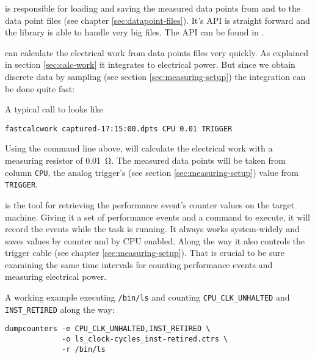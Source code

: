 \label{sec:special-developments}


\JWlfour{\JWTlibdp}

\JWTlibdp is responsible for loading and saving the measured data points from
and to the data point files (see chapter \ref{sec:datapoint-files}). It's API is
straight forward and the library is able to handle very big files. The API can
be found in .


\JWlfour{\JWTfcw}

\JWTfcw can calculate the electrical work from data points files very quickly.
As explained in section \ref{sec:calc-work} it integrates to electrical power.
But since we obtain discrete data by sampling (see section
\ref{sec:measuring-setup}) the integration can be done quite fast:


A typical call to \JWTfcw looks like

\begin{lstlisting}[style=Shell]
fastcalcwork captured-17:15:00.dpts CPU 0.01 TRIGGER
\end{lstlisting}

Using the command line above, \JWTfcw will calculate the electrical work with a
measuring resistor of \SI{0.01}{\ohm}. The measured data points will be taken
from column \texttt{CPU}, the analog trigger's (see section
\ref{sec:measuring-setup}) value from \texttt{TRIGGER}.


\JWlfour{\JWTdc}

\JWTdc is the tool for retrieving the performance event's counter values on the
target machine. Giving it a set of performance events and a command to execute,
it will record the events while the task is running. It always works
system-widely and saves values by counter and by CPU enabled. Along the way it
also controls the trigger cable (see chapter \ref{sec:measuring-setup}).  That
is crucial to be sure examining the same time intervals for counting performance
events and measuring electrical power.

A working example executing \texttt{/bin/ls} and counting
\texttt{CPU\_CLK\_UNHALTED} and \texttt{INST\_RETIRED} along the way:

\begin{lstlisting}[style=Shell]
dumpcounters -e CPU_CLK_UNHALTED,INST_RETIRED \
             -o ls_clock-cycles_inst-retired.ctrs \
             -r /bin/ls
\end{lstlisting}

